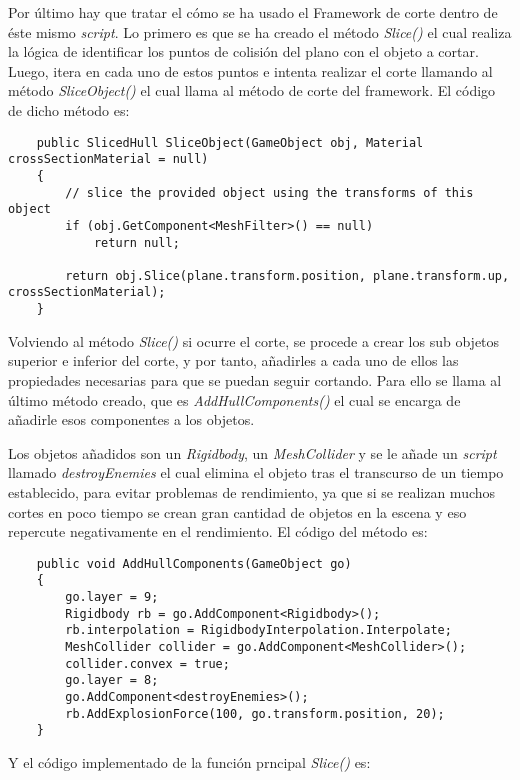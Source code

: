 Por último hay que tratar el cómo se ha usado el Framework de corte dentro de éste mismo \textit{script}. Lo primero es que se ha creado el método \textit{Slice()} el cual realiza la lógica de identificar los puntos de colisión del plano con el objeto a cortar. Luego, itera en cada uno de estos puntos e intenta realizar el corte llamando al método \textit{SliceObject()} el cual llama al método de corte del framework. El código de dicho método es: 

\begin{lstlisting}
    public SlicedHull SliceObject(GameObject obj, Material crossSectionMaterial = null)
    {
        // slice the provided object using the transforms of this object
        if (obj.GetComponent<MeshFilter>() == null)
            return null;

        return obj.Slice(plane.transform.position, plane.transform.up, crossSectionMaterial);
    }
\end{lstlisting}

Volviendo al método \textit{Slice()} si ocurre el corte, se procede a crear los sub objetos superior e inferior del corte, y por tanto, añadirles a cada uno de ellos las propiedades necesarias para que se puedan seguir cortando. Para ello se llama al último método creado, que es \textit{AddHullComponents()} el cual se encarga de añadirle esos componentes a los objetos.

Los objetos añadidos son un \textit{Rigidbody}, un \textit{MeshCollider} y se le añade un \textit{script} llamado \textit{destroyEnemies} el cual elimina el objeto tras el transcurso de un tiempo establecido, para evitar problemas de rendimiento, ya que si se realizan muchos cortes en poco tiempo se crean gran cantidad de objetos en la escena y eso repercute negativamente en el rendimiento. El código del método es:

\begin{lstlisting}
    public void AddHullComponents(GameObject go)
    {
        go.layer = 9;
        Rigidbody rb = go.AddComponent<Rigidbody>();
        rb.interpolation = RigidbodyInterpolation.Interpolate;
        MeshCollider collider = go.AddComponent<MeshCollider>();
        collider.convex = true;
        go.layer = 8;
        go.AddComponent<destroyEnemies>();
        rb.AddExplosionForce(100, go.transform.position, 20);
    }
\end{lstlisting}

Y el código implementado de la función prncipal \textit{Slice()} es: 

